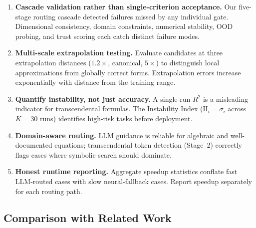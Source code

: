 \documentclass[twoside,11pt]{article}
\newcommand{\Rsq}{R^{2}}
\newcommand{\II}{\mathrm{II}}
\begin{document}
\begin{enumerate}
  \item \textbf{Cascade validation rather than single-criterion acceptance.} Our five-stage routing cascade detected failures missed by any individual gate. Dimensional consistency, domain constraints, numerical stability, OOD probing, and trust scoring each catch distinct failure modes.
  \item \textbf{Multi-scale extrapolation testing.} Evaluate candidates at three extrapolation distances ($1.2\times$, canonical, $5\times$) to distinguish local approximations from globally correct forms. Extrapolation errors increase exponentially with distance from the training range.
  \item \textbf{Quantify instability, not just accuracy.} A single-run $\Rsq$ is a misleading indicator for transcendental formulas. The Instability Index ($\II_i = \sigma_i$ across $K=30$ runs) identifies high-risk tasks before deployment.
  \item \textbf{Domain-aware routing.} LLM guidance is reliable for algebraic and well-documented equations; transcendental token detection (Stage~2) correctly flags cases where symbolic search should dominate.
  \item \textbf{Honest runtime reporting.} Aggregate speedup statistics conflate fast LLM-routed cases with slow neural-fallback cases. Report speedup separately for each routing path.
\end{enumerate}

\subsection{Comparison with Related Work}\label{subsec:comparison-with-related-work}
\label{sec:disc_related}
\end{document}
